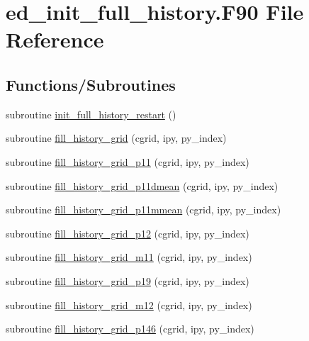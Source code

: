 \hypertarget{ed__init__full__history_8_f90}{}\section{ed\+\_\+init\+\_\+full\+\_\+history.\+F90 File Reference}
\label{ed__init__full__history_8_f90}
\subsection*{Functions/\+Subroutines}
\begin{DoxyCompactItemize}
\item 
subroutine \hyperlink{ed__init__full__history_8_f90_aae7df21bdc388f535c22bf77f8acb93f}{init\+\_\+full\+\_\+history\+\_\+restart} ()
\item 
subroutine \hyperlink{ed__init__full__history_8_f90_a8ef30add9a4d7b956d161cef5d36f08b}{fill\+\_\+history\+\_\+grid} (cgrid, ipy, py\+\_\+index)
\item 
subroutine \hyperlink{ed__init__full__history_8_f90_a38c5f3d4db7c22d95ce01d1accfc0f69}{fill\+\_\+history\+\_\+grid\+\_\+p11} (cgrid, ipy, py\+\_\+index)
\item 
subroutine \hyperlink{ed__init__full__history_8_f90_a04d2991f5602f06253a82ee6ccc4bc66}{fill\+\_\+history\+\_\+grid\+\_\+p11dmean} (cgrid, ipy, py\+\_\+index)
\item 
subroutine \hyperlink{ed__init__full__history_8_f90_a37e992ce3f847de0f41b0df90f76e42a}{fill\+\_\+history\+\_\+grid\+\_\+p11mmean} (cgrid, ipy, py\+\_\+index)
\item 
subroutine \hyperlink{ed__init__full__history_8_f90_a90c23553d125ef5f321e55c1c53a1553}{fill\+\_\+history\+\_\+grid\+\_\+p12} (cgrid, ipy, py\+\_\+index)
\item 
subroutine \hyperlink{ed__init__full__history_8_f90_a33cc0e01e253a845379cb936f508ddbd}{fill\+\_\+history\+\_\+grid\+\_\+m11} (cgrid, ipy, py\+\_\+index)
\item 
subroutine \hyperlink{ed__init__full__history_8_f90_ac9ef08b798e202f52554fd56b5f04e2f}{fill\+\_\+history\+\_\+grid\+\_\+p19} (cgrid, ipy, py\+\_\+index)
\item 
subroutine \hyperlink{ed__init__full__history_8_f90_a72c491dcb725e21eef99aa7b690a8cae}{fill\+\_\+history\+\_\+grid\+\_\+m12} (cgrid, ipy, py\+\_\+index)
\item 
subroutine \hyperlink{ed__init__full__history_8_f90_aaa801ea9c90a43ece7465948d12546cd}{fill\+\_\+history\+\_\+grid\+\_\+p146} (cgrid, ipy, py\+\_\+index)

\end{DoxyCompactItemize}
